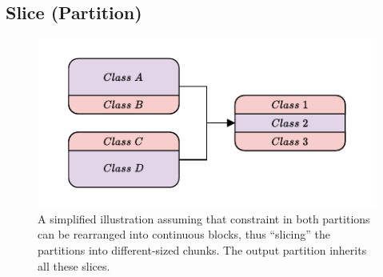 	
		\subsection{Slice (Partition)}
		\label{chap:tree:strategies:slice:part}
		
			\begin{figure}[ht!]
				\centering
				\includegraphics[scale=1.2]{Bilder/DrawIO/strat_slicing_pdf}
				\caption{A simplified illustration assuming that constraint in both partitions can be rearranged into continuous blocks, thus \enquote{slicing} the partitions into different-sized chunks. The output partition inherits all these slices.}
				\label{fig:tree:strat:slice}
			\end{figure}
		

